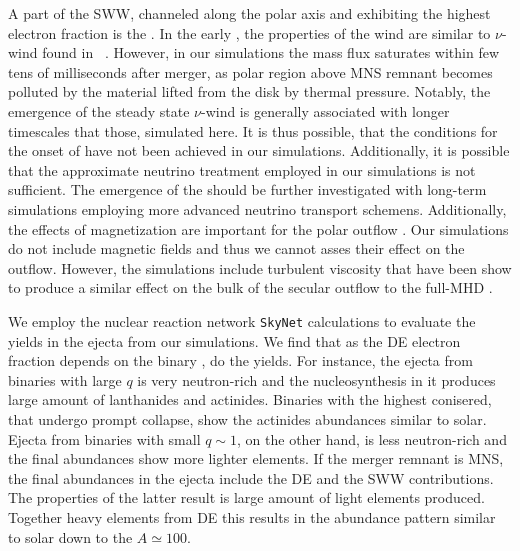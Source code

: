 A part of the \ac{SWW}, channeled along the polar axis and exhibiting the highest
electron fraction is the \nwind{}. In the early \pmerg{}, the properties 
of the wind are similar to $\nu$-wind found in 
\eg~\citet{Dessart:2008zd,Perego:2014fma,Fujibayashi:2020dvr}.
However, in our simulations the \nwind{} mass flux saturates within few tens 
of milliseconds after merger, as polar region above \ac{MNS} remnant 
becomes polluted by the material lifted from the disk by thermal pressure. 
Notably, the emergence of the steady state $\nu$-wind is generally associated 
with longer timescales that those, simulated here. It is thus possible, that the 
conditions for the onset of \nwind{} have not been achieved in our simulations.
Additionally, it is possible that the approximate neutrino treatment 
employed in our simulations is not sufficient. 
The emergence of the \nwind{} should be further investigated with long-term 
simulations employing more advanced neutrino transport schemens.
Additionally, the effects of magnetization are important for the polar outflow 
\citep{Siegel:2017nub,Metzger:2018uni,Fernandez:2018kax,Miller:2019dpt,Mosta:2020hlh}.
Our simulations do not include magnetic fields and thus we cannot asses their 
effect on the outflow. However, the simulations include turbulent viscosity 
that have been show to produce a similar effect on the bulk of the secular 
outflow to the full-\ac{MHD} \cite{Fernandez:2018kax}.

We employ the nuclear reaction network \texttt{SkyNet} calculations to evaluate the 
\rproc{} yields in the ejecta from our simulations.
We find that as the \ac{DE} electron fraction depends on the binary \mr{}, do the 
\rproc{} yields. For instance, the ejecta from binaries with large $q$ is very neutron-rich 
and the nucleosynthesis in it produces large amount of lanthanides and actinides.
Binaries with the highest \mr{} conisered, that undergo prompt collapse, show the 
actinides abundances similar to solar.
Ejecta from binaries with small $q{\sim}1$, on the other hand, is less neutron-rich 
and the final abundances show more lighter elements.
If the merger remnant is \ac{MNS}, the final \rproc{} abundances in the ejecta include the 
\ac{DE} and the \ac{SWW} contributions. The properties of the latter result is large amount 
of light elements produced. Together heavy elements from \ac{DE} this results in the abundance 
pattern similar to solar down to the $A \simeq 100$. 


